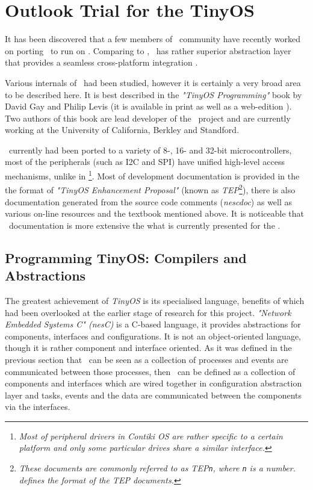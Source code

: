 \section{Outlook Trial for the TinyOS} \label{sec:TINYOS}

  It has been discovered that a few members of \TinyOS\ community
 have recently worked on porting \TinyOS\ to run on 
 \cite{tinyos:arch:rfa1-p1,tinyos:arch:rfa1-p2}. Comparing to \Contiki,
 \TinyOS\ has rather superior abstraction layer that provides a seamless
 cross-platform integration \cite{tinyos:tepXXX,tinyos:tepYYY,tinyos:tepZZZ}.
 
  Various internals of \TinyOS\ had been studied, however it is 
 certainly a very broad area to be described here. It is best described
 in the \emph{"TinyOS Programming"} book by David Gay and Philip Levis
 (it is available in print as well as a web-edition \cite{tinyos:book}).
 Two authors of this book are lead developer of the \TinyOS\ project
 and are currently working at the University of California, Berkley
 and Standford.


  \TinyOS\ currently had been ported to a variety of 8-, 16- and
 32-bit microcontrollers, most of the peripherals (such as I2C and SPI)
 have unified high-level access mechanisms, unlike in \Contiki\footnote{
 \emph{Most of peripheral drivers in Contiki OS are rather specific to
 a certain platform and only some particular drives share a similar
 interface.}}. Most of development documentation is provided in the
 the format of \emph{"TinyOS Enhancement Proposal"} (known as
 \emph{TEP}\footnote{\emph{These documents are commonly referred to as
 TEP\texttt{n}, where \texttt{n} is a number.  defines the format
 of the TEP documents.}}), there is also documentation generated from
 the source code comments (\emph{nescdoc}) as well as various on-line
 resources \cite{tos:wiki:docs} and the textbook mentioned above.
 It is noticeable that \TinyOS\ documentation is more extensive the
 what is currently presented for the \ContikiOS.


\subsection{Programming TinyOS: Compilers and Abstractions}

  The greatest achievement of \emph{TinyOS} is its specialised language,
 benefits of which had been overlooked at the earlier stage of research
 for this project. \emph{"Network Embedded Systems C" (nesC)} is a
 C-based language, it provides abstractions for components, interfaces
 and configurations. It is not an object-oriented language, though
 it is rather component and interface oriented. As it was defined in
 the previous section that \Contiki\ can be seen as a collection of
 processes and events are communicated between those processes, then
 \TinyOS\ can be defined as a collection of components and interfaces
 which are wired together in configuration abstraction layer and
 tasks, events and the data are communicated between the components
 via the interfaces.

